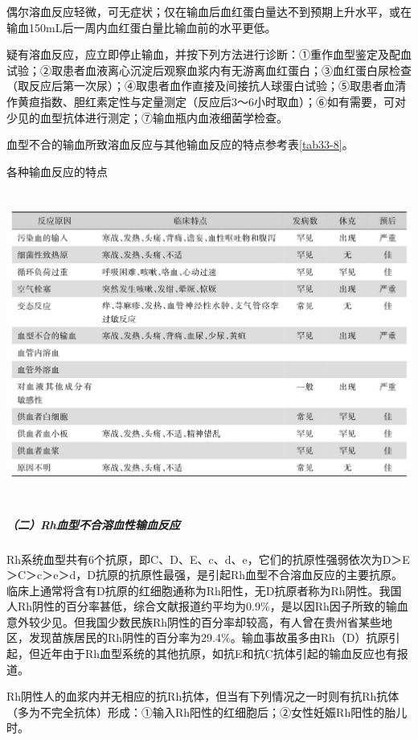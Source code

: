偶尔溶血反应轻微，可无症状；仅在输血后血红蛋白量达不到预期上升水平，或在输血150mL后一周内血红蛋白量比输血前的水平更低。

疑有溶血反应，应立即停止输血，并按下列方法进行诊断：①重作血型鉴定及配血试验；②取患者血液离心沉淀后观察血浆内有无游离血红蛋白；③血红蛋白尿检查（取反应后第一次尿）；④取患者血作直接及间接抗人球蛋白试验；⑤取患者血清作黄疸指数、胆红素定性与定量测定（反应后3～6小时取血）；⑥如有需要，可对少见的血型抗体进行测定；⑦输血瓶内血液细菌学检查。

血型不合的输血所致溶血反应与其他输血反应的特点参考表\ref{tab33-8}。

\begin{table}[htbp]
\centering
\caption{各种输血反应的特点}
\label{tab33-8}
\includegraphics[width=5.96875in,height=3.96875in]{./images/Image00180.jpg}
\end{table}

\subparagraph{（二）Rh血型不合溶血性输血反应}

Rh系统血型共有6个抗原，即C、D、E、c、d、e，它们的抗原性强弱依次为D＞E＞C＞c＞e＞d，D抗原的抗原性最强，是引起Rh血型不合溶血反应的主要抗原。临床上通常将含有D抗原的红细胞通称为Rh阳性，无D抗原者称为Rh阴性。我国人Rh阴性的百分率甚低，综合文献报道约平均为0.9\%，是以因Rh因子所致的输血意外较少见。但我国少数民族Rh阴性的百分率却较高，有人曾在贵州省某些地区，发现苗族居民的Rh阴性的百分率为29.4\%。输血事故虽多由Rh（D）抗原引起，但近年由于Rh血型系统的其他抗原，如抗E和抗C抗体引起的输血反应也有报道。

Rh阴性人的血浆内并无相应的抗Rh抗体，但当有下列情况之一时则有抗Rh抗体（多为不完全抗体）形成：①输入Rh阳性的红细胞后；②女性妊娠Rh阳性的胎儿时。

